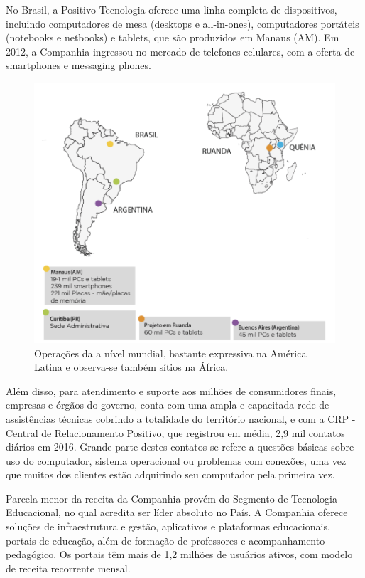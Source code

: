 No Brasil, a Positivo Tecnologia oferece uma linha completa de dispositivos, incluindo computadores de mesa (desktops e all-in-ones), computadores portáteis (notebooks e netbooks) e tablets, que são produzidos em Manaus (AM). Em 2012, a Companhia ingressou no mercado de telefones celulares, com a oferta de smartphones e messaging phones.

\begin{figure}[h]
\begin{centering}
\includegraphics[width=1.0\textwidth]{Img/PositivoMundo}
\caption{Operações da \nomePositivo{} a nível mundial, bastante expressiva na América Latina e observa-se também sítios na África.}
\par\end{centering}
\end{figure}

Além disso, para atendimento e suporte aos milhões de consumidores finais, empresas e órgãos do governo, conta com uma ampla e capacitada rede de assistências técnicas cobrindo a totalidade do território nacional, e com a CRP - Central de Relacionamento Positivo, que registrou em média, 2,9 mil contatos diários em 2016. Grande parte destes contatos se refere a questões básicas sobre uso do computador, sistema operacional ou problemas com conexões, uma vez que muitos dos clientes estão adquirindo seu computador pela primeira vez.

Parcela menor da receita da Companhia provém do Segmento de Tecnologia Educacional, no qual acredita ser líder absoluto no País. A Companhia oferece soluções de infraestrutura e gestão, aplicativos e plataformas educacionais, portais de educação, além de formação de professores e acompanhamento pedagógico. Os portais têm mais de 1,2 milhões de usuários ativos, com modelo de receita recorrente mensal. 


